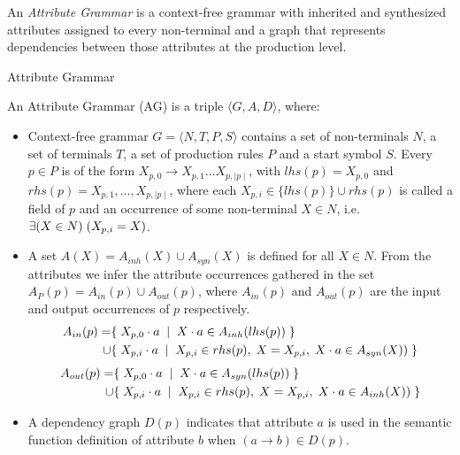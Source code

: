 
An \emph{Attribute Grammar} is a context-free grammar with inherited
and synthesized attributes assigned to every non-terminal
and a graph that represents dependencies between those attributes
at the production level.

\begin{definition}{Attribute Grammar}

An Attribute Grammar (AG) is a triple $\langle G,A,D\rangle$, where:
\begin{itemize}
 \item Context-free grammar $G = \langle N,T,P,S\rangle$ contains a set of
    non-terminals $N$, a set of terminals $T$, a set of production
    rules $P$ and a start symbol $S$. Every $p\in P$ is of the form
    $X_{p,0}\rightarrow X_{p,1}\ldots X_{p,\mid p\mid}$, with $lhs(p) = X_{p,0}$
    and $rhs(p) = X_{p,1},\ldots ,X_{p,\mid p\mid}$, where each $X_{p,i}\in
    \{lhs(p)\}\cup rhs(p)$ is called a field of $p$ and an occurrence of
    some non-terminal $X\in N$, i.e. $\exists(X\in N)\;(X_{p,i} = X)$.
 \item A set $A(X) = A_{inh}(X) \cup A_{syn}(X)$ is defined for all $X\in N$.
    From the attributes we infer the attribute occurrences gathered in 
    the set $A_P(p) = A_{in}(p) \cup A_{out}(p)$, where $A_{in}(p)$ 
    and $A_{out}(p)$ are the input and output occurrences of $p$ respectively.
    \begin{equation*}
     \begin{aligned}
        A_{in}(p) = &\{\;X_{p,0} \cdot a\;\;|\;\;X \cdot a \in A_{inh}(lhs(p))\;\}\\
        \cup &\{\;X_{p,i} \cdot a\;\;|\;\;X_{p,i} \in rhs(p) 
                                ,\; X = X_{p,i}
                                ,\; X \cdot a \in A_{syn}(X)) \;\}
     \end{aligned}
    \end{equation*}
    \begin{equation*}
     \begin{aligned}
        A_{out}(p) = &\{\;X_{p,0} \cdot a\;\;|\;\;X \cdot a \in A_{syn}(lhs(p))\;\}\\
        \cup &\{\;X_{p,i} \cdot a\;\;|\;\;X_{p,i} \in rhs(p) 
                                ,\; X = X_{p,i}
                                ,\; X \cdot a \in A_{inh}(X)) \;\}
     \end{aligned}
    \end{equation*}
 \item A dependency graph $D(p)$ indicates that attribute $a$ is used in
    the semantic function definition of attribute $b$ when 
    $(a\rightarrow b)\in D(p)$.
\end{itemize}
\end{definition}

